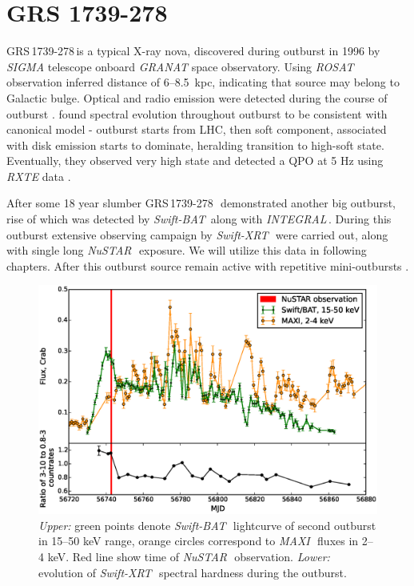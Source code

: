 \documentclass[a4paper,fleqn,usenatbib]{mnras}
\def\grs{{GRS\,1739-278\,}}
\def\swiftx{{\em Swift-XRT\,}}
\def\swiftb{{\em Swift-BAT\,}}
\def\nustar{{\em NuSTAR\,}}
\def\integral{{\em INTEGRAL\,}}
\def\maxi{{\em MAXI\,}}
\begin{document}
\section{GRS 1739-278}

\grs is a typical X-ray nova, discovered during outburst in 1996  \citep{paul96} by {\it SIGMA} \citep{paul91} telescope onboard {\it GRANAT} space observatory.
Using {\it ROSAT} observation \cite{greiner96} inferred distance of 6--8.5~kpc, indicating that source may belong to Galactic bulge. Optical and radio emission were detected during the course of outburst \citep{hjellming96,marti97}. \cite{borozdin98} found spectral evolution throughout outburst to be consistent with canonical model - outburst starts from LHC, then soft component, associated with disk emission starts to dominate, heralding transition to high-soft state. Eventually, they observed very high state and detected a  QPO at 5 Hz using {\it RXTE} data \citep{borozdin00}.

After some 18 year slumber \grs\, demonstrated another big outburst, rise of which was detected by \swiftb \citep{krimm14_atel} along with \integral \citep{filippova14}. During this outburst extensive observing campaign by \swiftx\, were carried out, along with single long \nustar\, exposure. We will utilize this data in following chapters. After this outburst source remain active with repetitive mini-outbursts \citep{mereminskiy16,yan17}.



\begin{figure}
\centerline{\includegraphics[scale=0.5]{batlc_v06.eps}}
\caption{{\it Upper:} green points denote \swiftb\, lightcurve of second outburst in 15--50 keV range, orange circles correspond to \maxi\, fluxes in 2--4 keV. Red line show time of \nustar\, observation. {\it Lower:} evolution of \swiftx\, spectral hardness during the outburst.} 
\label{fig:batlc}
\end{figure} 
\end{document}
